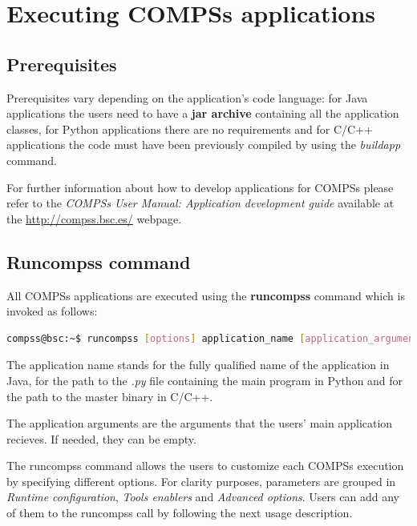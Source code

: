 \section{Executing COMPSs applications}
\label{sec:Executing}


\subsection{Prerequisites}
\label{subsec:prerequisites}
Prerequisites vary depending on the application's code language: for Java applications the users need to have
a \textbf{jar archive} containing all the application classes, for Python applications there are no requirements and for
C/C++ applications the code must have been previously compiled by using the \textit{buildapp} command.

For further information about how to develop applications for COMPSs please refer to the \textit{COMPSs User 
Manual: Application development guide} available at the \url{http://compss.bsc.es/} webpage.


\subsection{Runcompss command}
\label{subsec:runcompss}
All COMPSs applications are executed using the \textbf{runcompss} command which is invoked as follows:
\begin{lstlisting}[language=bash]
compss@bsc:~$ runcompss [options] application_name [application_arguments]
\end{lstlisting}

The application name stands for the fully qualified name of the application in Java, for the path to the \textit{.py} file
containing the main program in Python and for the path to the master binary in C/C++. 

The application arguments are the arguments that the users' main application recieves. If needed, they can be empty. 

The runcompss command allows the users to customize each COMPSs execution by specifying different options.
For clarity purposes, parameters are grouped in \textit{Runtime configuration}, \textit{Tools enablers}
and \textit{Advanced options}. Users can add any of them to the runcompss call by following the next 
usage description.

